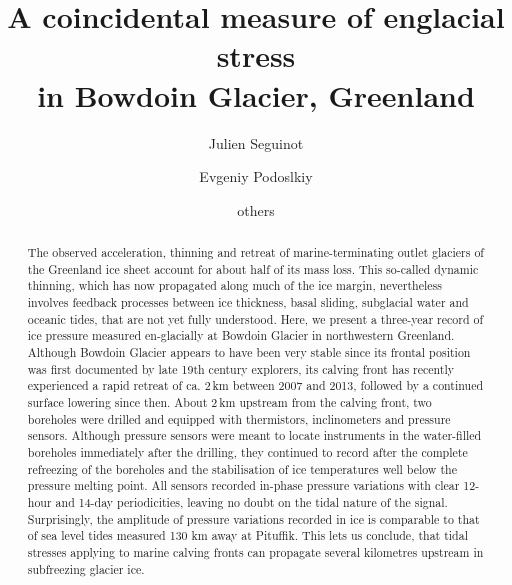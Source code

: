 \documentclass[utf8]{article}
\title{A coincidental measure of englacial stress \\
       in Bowdoin Glacier, Greenland}
\author[1]{Julien Seguinot}
\author[2]{Evgeniy Podoslkiy}
\author[ ]{others}
\affil[1]{Independent scholar, Anafi, Greece}
\affil[2]{Arctic Research Center, Hokkaido University, Sapporo, Japan}
\begin{document}

\maketitle

\begin{abstract}

    The observed acceleration, thinning and retreat of marine-terminating
    outlet glaciers of the Greenland ice sheet account for about half of its
    mass loss. This so-called dynamic thinning, which has now propagated along
    much of the ice margin, nevertheless involves feedback processes between
    ice thickness, basal sliding, subglacial water and oceanic tides, that are
    not yet fully understood.
    Here, we present a three-year record of ice pressure measured en-glacially
    at Bowdoin Glacier in northwestern Greenland. Although Bowdoin Glacier
    appears to have been very stable since its frontal position was first
    documented by late 19th century explorers, its calving front has recently
    experienced a rapid retreat of ca. 2\,km between 2007 and 2013, followed by
    a continued surface lowering since then.
    About 2\,km upstream from the calving front, two boreholes were drilled and
    equipped with thermistors, inclinometers and pressure sensors. Although
    pressure sensors were meant to locate instruments in the water-filled
    boreholes immediately after the drilling, they continued to record after
    the complete refreezing of the boreholes and the stabilisation of ice
    temperatures well below the pressure melting point. All sensors recorded
    in-phase pressure variations with clear 12-hour and 14-day periodicities,
    leaving no doubt on the tidal nature of the signal. Surprisingly, the
    amplitude of pressure variations recorded in ice is comparable to that of
    sea level tides measured 130 km away at Pituffik. This lets us conclude,
    that tidal stresses applying to marine calving fronts can propagate several
    kilometres upstream in subfreezing glacier ice.

\end{abstract}

\end{document}
